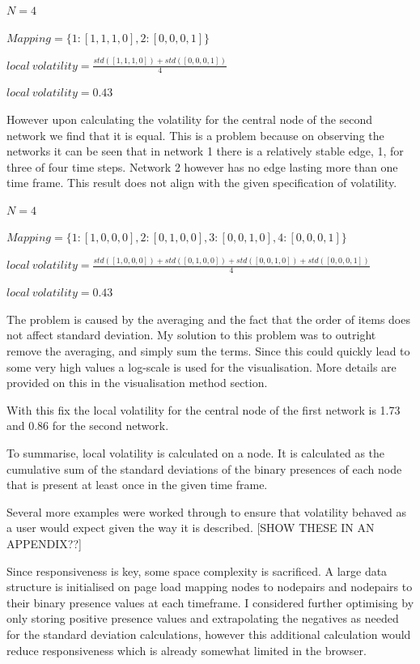 \begin{center}
$N = 4$

$Mapping = \{1:[1, 1, 1, 0], 2:[0, 0, 0, 1]\}$

$local\ volatility = \frac{std([1,1,1,0]) + std([0,0,0,1])}{4}$

$local\ volatility = 0.43$
\end{center}

However upon calculating the volatility for the central node of the second network we find that it is equal. This is a problem because on observing the networks it can be seen that in network 1 there is a relatively stable edge, 1, for three of four time steps. Network 2 however has no edge lasting more than one time frame. This result does not align with the given specification of volatility.

\begin{center}
$N = 4$

$Mapping = \{1:[1, 0, 0, 0], 2:[0, 1, 0, 0], 3: [0, 0, 1, 0], 4: [0, 0, 0, 1]\}$

$local\ volatility = \frac{std([1,0,0,0]) + std([0,1,0,0]) + std([0,0,1,0]) + std([0,0,0,1])}{4}$

$local\ volatility = 0.43$
\end{center}

The problem is caused by the averaging and the fact that the order of items does not affect standard deviation. My solution to this problem was to outright remove the averaging, and simply sum the terms. Since this could quickly lead to some very high values a log-scale is used for the visualisation. More details are provided on this in the visualisation method section\link{}.  

With this fix the local volatility for the central node of the first network is 1.73 and 0.86 for the second network. 

To summarise, local volatility is calculated on a node. It is calculated as the cumulative sum of the standard deviations of the binary presences of each node that is present at least once in the given time frame.

Several more examples were worked through to ensure that volatility behaved as a user would expect given the way it is described. [SHOW THESE IN AN APPENDIX??]

Since responsiveness is key, some space complexity is sacrificed. A large data structure is initialised on page load mapping nodes to nodepairs and nodepairs to their binary presence values at each timeframe.
I considered further optimising by only storing positive presence values and extrapolating the negatives as needed for the standard deviation calculations, however this additional calculation would reduce responsiveness which is already somewhat limited in the browser.

